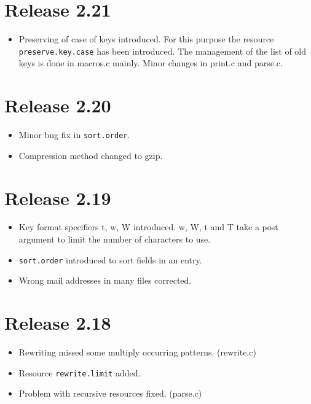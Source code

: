 \documentclass[11pt,a4paper]{scrartcl}
\newcommand\rsc[1]{\texttt{#1}}
\newcommand\File[1]{\textsf{#1}}
\newenvironment{Release}[2]{%
  \def\tmp{#2}%
  \section*{Release #1 \ifx\tmp\empty\else{\normalsize[#2]}\fi}
  \begin{itemize}
}{\end{itemize}}
\newenvironment{Fix}[1]{\item }{}
\newenvironment{New}[1]{\item }{}
\newenvironment{Update}[1]{\item }{}
\begin{document}
\begin{multicols}
 \begin{Release}{2.21}{}
  \begin{New}{gene}
    Preserving of case of keys introduced. For this purpose the
    resource \rsc{preserve.key.case} has been introduced. The
    management of the list of old keys is done in \File{macros.c}
    mainly. Minor changes in \File{print.c} and \File{parse.c}.
  \end{New}
 \end{Release}

 \begin{Release}{2.20}{}
  \begin{Fix}{gene}
    Minor bug fix in \rsc{sort.order}.
  \end{Fix}
  \begin{Update}{gene}
    Compression method changed to gzip.
  \end{Update}
 \end{Release}

 \begin{Release}{2.19}{}
  \begin{New}{gene}
    Key format specifiers t, w, W introduced. w, W, t and T take a
    post argument to limit the number of characters to use.
  \end{New}
  \begin{New}{gene}
    \rsc{sort.order} introduced to sort fields in an entry.
  \end{New}
  \begin{Update}{gene}
    Wrong mail addresses in many files corrected.
  \end{Update}
 \end{Release}

 \begin{Release}{2.18}{}
  \begin{Fix}{gene}
    Rewriting missed some multiply occurring patterns.
    (\File{rewrite.c})
  \end{Fix}
  \begin{New}{gene}
    Resource \rsc{rewrite.limit} added.
  \end{New}
  \begin{Fix}{gene}
    Problem with recursive resources fixed. (\File{parse.c})
  \end{Fix}
 \end{Release}


\end{multicols}
\end{document}
